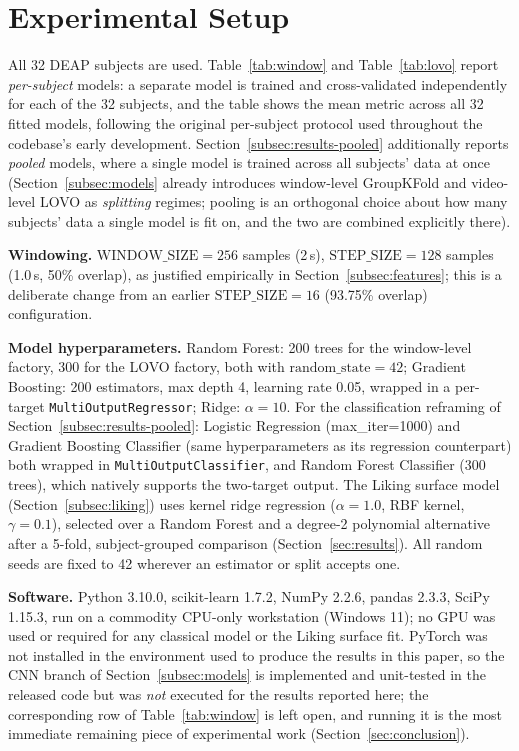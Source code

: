 \documentclass[conference]{IEEEtran}
\begin{document}
\section{Experimental Setup}
\label{sec:experiments}

All 32 DEAP subjects are used. Table~\ref{tab:window} and
Table~\ref{tab:lovo} report \emph{per-subject} models: a separate model
is trained and cross-validated independently for each of the 32
subjects, and the table shows the mean metric across all 32 fitted
models, following the original per-subject protocol used throughout the
codebase's early development. Section~\ref{subsec:results-pooled}
additionally reports \emph{pooled} models, where a single model is
trained across all subjects' data at once (Section~\ref{subsec:models}
already introduces window-level GroupKFold and video-level LOVO as
\emph{splitting} regimes; pooling is an orthogonal choice about how many
subjects' data a single model is fit on, and the two are combined
explicitly there).

\textbf{Windowing.} $\text{WINDOW\_SIZE}=256$ samples (2\,s),
$\text{STEP\_SIZE}=128$ samples (1.0\,s, 50\% overlap), as justified
empirically in Section~\ref{subsec:features}; this is a deliberate change
from an earlier $\text{STEP\_SIZE}=16$ (93.75\% overlap) configuration.

\textbf{Model hyperparameters.} Random Forest: 200 trees for the
window-level factory, 300 for the LOVO factory, both with
$\text{random\_state}=42$; Gradient Boosting: 200 estimators, max depth
4, learning rate 0.05, wrapped in a per-target
\texttt{MultiOutputRegressor}; Ridge: $\alpha=10$. For the classification
reframing of Section~\ref{subsec:results-pooled}: Logistic Regression
(max\_iter=1000) and Gradient Boosting Classifier (same hyperparameters
as its regression counterpart) both wrapped in
\texttt{MultiOutputClassifier}, and Random Forest Classifier (300 trees),
which natively supports the two-target output. The Liking surface model
(Section~\ref{subsec:liking}) uses kernel ridge regression
($\alpha=1.0$, RBF kernel, $\gamma=0.1$), selected over a Random Forest
and a degree-2 polynomial alternative after a 5-fold, subject-grouped
comparison (Section~\ref{sec:results}). All random seeds are fixed to 42
wherever an estimator or split accepts one.

\textbf{Software.} Python 3.10.0, scikit-learn 1.7.2, NumPy 2.2.6, pandas
2.3.3, SciPy 1.15.3, run on a commodity CPU-only workstation (Windows
11); no GPU was used or required for any classical model or the Liking
surface fit. PyTorch was not installed in the environment used to
produce the results in this paper, so the CNN branch of
Section~\ref{subsec:models} is implemented and unit-tested in the
released code but was \emph{not} executed for the results reported
here; the corresponding row of Table~\ref{tab:window} is left open, and
running it is the most immediate remaining piece of experimental work
(Section~\ref{sec:conclusion}).
\end{document}

